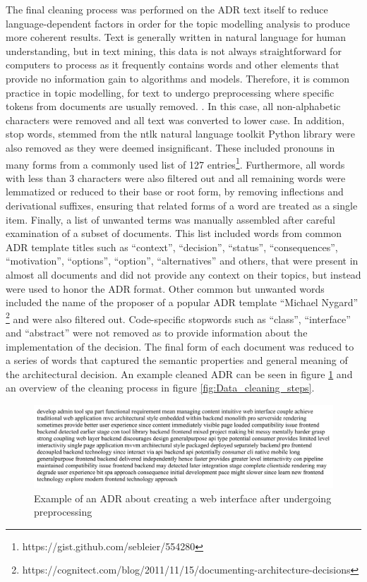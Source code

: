     The final cleaning process was performed on the ADR text itself to reduce language-dependent factors in order for the topic modelling analysis to produce more coherent results. Text is generally written in natural language for human understanding, but in text mining, this data is not always straightforward for computers to process as it frequently contains words and other elements that provide no information gain to algorithms and models. Therefore, it is common practice in topic modelling, for text to undergo preprocessing where specific tokens from documents are usually removed. \cite{topic-modelling-text-cleaning, text-mining-lda}. In this case, all non-alphabetic characters were removed and all text was converted to lower case. In addition, stop words, stemmed from the ntlk natural language toolkit Python library were also removed as they were deemed insignificant. These included pronouns in many forms from a commonly used list of 127 entries\footnote{https://gist.github.com/sebleier/554280}. Furthermore, all words with less than 3 characters were also filtered out and all remaining words were lemmatized or reduced to their base or root form, by removing inflections and derivational suffixes, ensuring that related forms of a word are treated as a single item. Finally, a list of unwanted terms was manually assembled after careful examination of a subset of documents. This list included words from common ADR template titles such as ``context'', ``decision'', ``status'', ``consequences'', ``motivation'', ``options'', ``option'', ``alternatives'' and others, that were present in almost all documents and did not provide any context on their topics, but instead were used to honor the ADR format. Other common but unwanted words included the name of the proposer of a popular ADR template ``Michael Nygard'' \footnote{https://cognitect.com/blog/2011/11/15/documenting-architecture-decisions} and were also filtered out. Code-specific stopwords such as ``class'', ``interface'' and ``abstract'' were not removed as to provide information about the implementation of the decision. The final form of each document was reduced to a series of words that captured the semantic properties and general meaning of the architectural decision. An example cleaned ADR can be seen in figure \ref{fig:Cleaned_ADR} and an overview of the cleaning process in figure \ref{fig:Data_cleaning_steps}.
    
    \begin{figure}
        \centering
        \includegraphics[scale=0.6]{figures/adr_cleaned_example.jpeg}
        \caption{Example of an ADR about creating a web interface after undergoing preprocessing}
        \label{fig:Cleaned_ADR}
    \end{figure}

